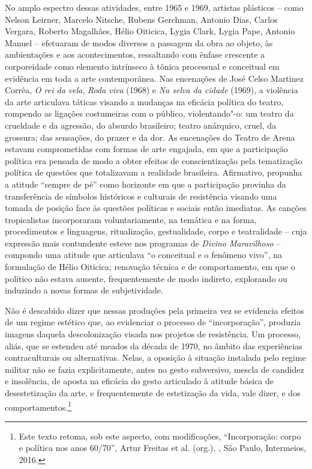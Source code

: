 No amplo espectro dessas atividades, entre 1965 e 1969, artistas
plásticos -- como Nelson Leirner, Marcelo Nitsche, Rubens Gerchman,
Antonio Dias, Carlos Vergara, Roberto Magalhães, Hélio Oiticica, Lygia
Clark, Lygia Pape, Antonio Manuel -- efetuaram de modos diversos a
passagem da obra ao objeto, às ambientações e aos acontecimentos,
ressaltando com ênfase crescente a corporeidade como elemento intrínseco
à tônica processual e conceitual em evidência em toda a arte
contemporânea. Nas encenações de José Celso Martinez Corrêa, \emph{O rei
da vela}, \emph{Roda viva} (1968) e \emph{Na selva da cidade} (1969), a
violência da arte articulava táticas visando a mudanças na eficácia
política do teatro, rompendo as ligações costumeiras com o público,
violentando"-o: um teatro da crueldade e da agressão, do absurdo
brasileiro; teatro anárquico, cruel, da grossura; das sensações, do
prazer e da dor. As encenações do Teatro de Arena estavam comprometidas
com formas de arte engajada, em que a participação política era pensada
de modo a obter efeitos de conscientização pela tematização política de
questões que totalizavam a realidade brasileira. Afirmativo, propunha a
atitude ``sempre de pé'' como horizonte em que a participação provinha
da transferência de símbolos históricos e culturais de resistência
visando uma tomada de posição face às questões políticas e sociais então
imediatas. As canções tropicalistas incorporaram voluntariamente, na
temática e na forma, procedimentos e linguagens, ritualização,
gestualidade, corpo e teatralidade -- cuja expressão mais contundente
esteve nos programas de  \emph{Divino Maravilhoso} -- compondo uma
atitude que articulava ``o conceitual e o fenômeno vivo'', na formulação
de Hélio Oiticica; renovação técnica e de comportamento, em que o
político não estava ausente, frequentemente de modo indireto, explorando
ou induzindo a novas formas de subjetividade.

Não é descabido dizer que nessas produções pela primeira vez se
evidencia efeitos de um regime estético que, ao evidenciar o processo de
``incorporação'', produzia imagens daquela descolonização visada nos
projetos de resistência. Um processo, aliás, que se estendeu até meados
da década de 1970, no âmbito das experiências contraculturais ou
alternativas. Nelas, a oposição à situação instalada pelo regime militar
não se fazia explicitamente, antes no gesto subversivo, mescla de
candidez e insolência, de aposta na eficácia do gesto articulado à
atitude básica de desestetização da arte, e frequentemente de
estetização da vida, vale dizer, e dos comportamentos.\footnote{Este
texto retoma, sob este aspecto, com modificações, ``Incorporação:
corpo e política nos anos 60/70'', Artur Freitas et al. (org.),
{}, São Paulo, Intermeios, 2016.}

